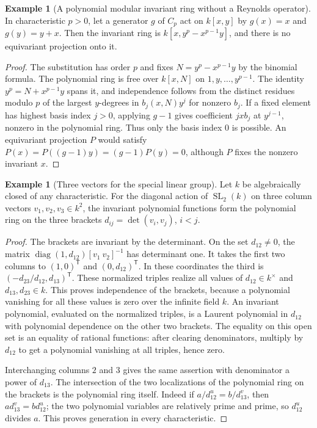 \documentclass[11pt,oneside,openany]{book}
\theoremstyle{definition}
\newtheorem{example}[theorem]{Example}
\theoremstyle{remark}
\begin{document}
\begin{example}[A polynomial modular invariant ring without a Reynolds operator]
\label{res:IN09}
In characteristic \(p>0\), let a generator \(g\) of \(C_p\)
act on \(k[x,y]\) by \(g(x)=x\) and \(g(y)=y+x\).
Then the invariant ring is \(k[x,y^p-x^{p-1}y]\), and
there is no equivariant projection onto it.
\end{example}
\begin{proof}
The substitution has order \(p\) and fixes
\(N=y^p-x^{p-1}y\) by the binomial formula. The polynomial
ring is free over \(k[x,N]\) on \(1,y,\ldots,y^{p-1}\).
The identity \(y^p=N+x^{p-1}y\) spans it, and independence
follows from the distinct residues modulo \(p\) of the
largest \(y\)-degrees in \(b_j(x,N)y^j\) for nonzero
\(b_j\). If a fixed element has highest basis index
\(j>0\), applying \(g-1\) gives coefficient \(jxb_j\) at
\(y^{j-1}\), nonzero in the polynomial ring. Thus only
the basis index \(0\) is possible. An equivariant
projection \(P\) would satisfy
\(P(x)=P((g-1)y)=(g-1)P(y)=0\), although \(P\) fixes
the nonzero invariant \(x\).
\end{proof}

\begin{example}[Three vectors for the special linear group]
\label{res:IN10}
Let \(k\) be algebraically closed of any characteristic.
For the diagonal action of \(\operatorname{SL}_2(k)\)
on three column vectors \(v_1,v_2,v_3\in k^2\), the
invariant polynomial functions form the polynomial ring
on the three brackets \(d_{ij}=\det(v_i,v_j)\), \(i<j\).
\end{example}
\begin{proof}
The brackets are invariant by the determinant.
On the set \(d_{12}\ne0\), the matrix
\(\operatorname{diag}(1,d_{12})[v_1\ v_2]^{-1}\) has determinant
one. It takes the first two columns to \((1,0)^{\mathsf T}\)
and \((0,d_{12})^{\mathsf T}\). In these coordinates the
third is \((-d_{23}/d_{12},d_{13})^{\mathsf T}\).
These normalized triples realize all values of
\(d_{12}\in k^\times\) and \(d_{13},d_{23}\in k\).
This proves independence of the brackets, because a
polynomial vanishing for all these values is zero over
the infinite field \(k\). An invariant polynomial, evaluated
on the normalized triples, is a Laurent polynomial in
\(d_{12}\) with polynomial dependence on the other two brackets.
The equality on this open set is an equality of rational
functions: after clearing denominators, multiply by \(d_{12}\)
to get a polynomial vanishing at all triples, hence zero.

Interchanging columns \(2\) and \(3\) gives the same assertion
with denominator a power of \(d_{13}\). The intersection of the
two localizations of the polynomial ring on the brackets is
the polynomial ring itself. Indeed if
\(a/d_{12}^u=b/d_{13}^v\), then
\(a d_{13}^v=b d_{12}^u\); the two polynomial variables
are relatively prime and prime, so \(d_{12}^u\) divides \(a\).
This proves generation in every characteristic.
\end{proof}
\end{document}
